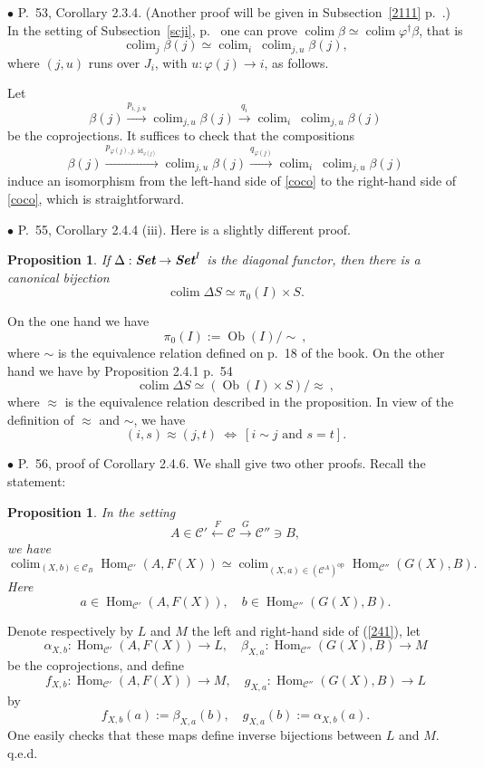 \documentclass[12pt]{article}
\newtheorem{prop}[thm]{Proposition}
\theoremstyle{remark}%
\newcommand{\bu}{\bullet}
\newcommand{\n}{\noindent}
\newcommand{\C}{\mathcal C}
\newcommand{\p}{\varphi}
\newcommand{\pf}{\n{\em Proof. }}
\newcommand{\be}{\begin{equation}}
\newcommand{\ee}{\end{equation}}
\newcommand{\bp}{\begin{prop}}
\newcommand{\ep}{\end{prop}}
\DeclareMathOperator*{\coli}{colim}
\DeclareMathOperator*{\co}{colim}
\DeclareMathOperator{\id}{id}
\DeclareMathOperator{\Hom}{Hom}
\DeclareMathOperator{\Ob}{Ob}
\DeclareMathOperator{\op}{op}
\begin{document}

\n$\bu$ P.~53, Corollary 2.3.4. (Another proof will be given in Subsection~\ref{2111} p.~\pageref{2111}.) In the setting of Subsection~\ref{scji}, p.~\pageref{scji} one can prove $\co\beta\simeq\co\p^\dagger\beta$, that is 
%
\be\label{coco} 
\co_j\beta(j)\simeq\co_i\ \co_{j,u}\beta(j),  
\ee 
% 
where $(j,u)$ runs over $J_i$, with $u:\p(j)\to i$, as follows. 

Let 
$$ 
\beta(j)\xrightarrow{p_{i,j,u}}\co_{j,u}\beta(j)\xrightarrow{q_i}\co_i\ \co_{j,u}\beta(j)
$$ 
be the coprojections. It suffices to check that the compositions 
$$
\beta(j)\xrightarrow{p_{\p(j),j,\id_{\p(j)}}}\co_{j,u}\beta(j)\xrightarrow{q_{\p(j)}}\co_i\ \co_{j,u}\beta(j)
$$ 
induce an isomorphism from the left-hand side of \eqref{coco} to the right-hand side of \eqref{coco}, which is straightforward. 


\n$\bu$ P.~55, Corollary 2.4.4 (iii). Here is a slightly different proof. 
%
\bp 
If $\Delta:\textbf{\em Set}\to\textbf{\em Set}^I$ is the diagonal functor, then there is a canonical bijection
$$
\coli\Delta S\simeq\pi_0(I)\times S.
$$
\ep 
%
\pf On the one hand we have 
$$
\pi_0(I):=\Ob(I)/\!\!\sim\ , 
$$
where $\sim$ is the equivalence relation defined on p.~18 of the book. On the other hand  we have by Proposition 2.4.1 p.~54
$$
\coli\Delta S\simeq(\Ob(I)\times S)/\!\!\approx\ ,
$$
where $\approx$ is the equivalence relation described in the proposition. In view of the definition of $\approx$ and $\sim$, we have 
$$
(i,s)\approx(j,t)\ \iff\ [i\sim j\text{ and }s=t].
$$  


\n$\bu$ P.~56, proof of Corollary 2.4.6. We shall give two other proofs. Recall the statement: 
%
\bp 
In the setting 
% 
\begin{equation}\label{241s}
A\in\C'\xleftarrow{F}\C\xrightarrow{G}\C''\ni B, 
\end{equation} 
% 
we have 
% 
\begin{equation}\label{241} 
\coli_{(X,b)\in\C_B}\Hom_{\C'}(A,F(X))\simeq 
\coli_{(X,a)\in(\C^A)^{\op}}\Hom_{\C''}(G(X),B). 
\end{equation} 
% 
Here  
$$
a\in\Hom_{\C'}(A,F(X)),\quad b\in\Hom_{\C''}(G(X),B). 
$$ 
\ep
% 
\n{\em First proof.} Denote respectively by $L$ and $M$ the left and right-hand side of (\ref{241}), let 
$$
\alpha_{X,b}:\Hom_{\C'}(A,F(X))\to L,\quad\beta_{X,a}:\Hom_{\C''}(G(X),B)\to M
$$
be the coprojections, and define 
$$
f_{X,b}:\Hom_{\C'}(A,F(X))\to M,\quad g_{X,a}:\Hom_{\C''}(G(X),B)\to L
$$
by
$$
f_{X,b}(a):=\beta_{X,a}(b),\quad g_{X,a}(b):=\alpha_{X,b}(a).
$$
One easily checks that these maps define inverse bijections between $L$ and $M$. q.e.d. 
\end{document}
